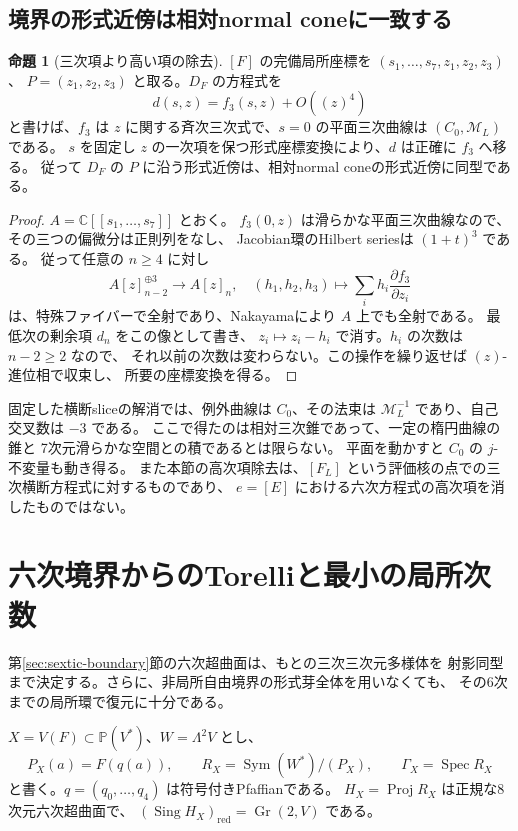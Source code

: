 \documentclass[a4paper,11pt]{ltjsarticle}
\theoremstyle{definition}
\newtheorem{theorem}{命題}[section]
\newcommand{\CC}{\mathbb C}
\newcommand{\PP}{\mathbb P}
\newcommand{\Gr}{\operatorname{Gr}}
\begin{document}
\subsection{境界の形式近傍は相対normal coneに一致する}

\begin{theorem}[三次項より高い項の除去]\label{thm:relative-cubic-formality}
$[F]$ の完備局所座標を $(s_1,\ldots,s_7,z_1,z_2,z_3)$、
$P=(z_1,z_2,z_3)$ と取る。$D_F$ の方程式を
\[
 d(s,z)=f_3(s,z)+O((z)^4)
\]
と書けば、$f_3$ は $z$ に関する斉次三次式で、$s=0$ の平面三次曲線は
$(C_0,\mathcal M_L)$ である。
$s$ を固定し $z$ の一次項を保つ形式座標変換により、$d$ は正確に $f_3$ へ移る。
従って $D_F$ の $P$ に沿う形式近傍は、相対normal coneの形式近傍に同型である。
\end{theorem}

\begin{proof}
$A=\CC[[s_1,\ldots,s_7]]$ とおく。
$f_3(0,z)$ は滑らかな平面三次曲線なので、その三つの偏微分は正則列をなし、
Jacobian環のHilbert seriesは $(1+t)^3$ である。
従って任意の $n\ge4$ に対し
\[
 A[z]_{n-2}^{\oplus3}\longrightarrow A[z]_n,
 \quad(h_1,h_2,h_3)\longmapsto
 \sum_i h_i\frac{\partial f_3}{\partial z_i}
\]
は、特殊ファイバーで全射であり、Nakayamaにより $A$ 上でも全射である。
最低次の剰余項 $d_n$ をこの像として書き、
$z_i\mapsto z_i-h_i$ で消す。$h_i$ の次数は $n-2\ge2$ なので、
それ以前の次数は変わらない。この操作を繰り返せば $(z)$-進位相で収束し、
所要の座標変換を得る。
\end{proof}

固定した横断sliceの解消では、例外曲線は $C_0$、その法束は
$\mathcal M_L^{-1}$ であり、自己交叉数は $-3$ である。
ここで得たのは相対三次錐であって、一定の楕円曲線の錐と
7次元滑らかな空間との積であるとは限らない。
平面を動かすと $C_0$ の $j$-不変量も動き得る。
また本節の高次項除去は、$[F_L]$ という評価核の点での三次横断方程式に対するものであり、
$e=[E]$ における六次方程式の高次項を消したものではない。

\section{六次境界からのTorelliと最小の局所次数}\label{sec:boundary-torelli}

第\ref{sec:sextic-boundary}節の六次超曲面は、もとの三次三次元多様体を
射影同型まで決定する。さらに、非局所自由境界の形式芽全体を用いなくても、
その6次までの局所環で復元に十分である。

$X=V(F)\subset\PP(V^*)$、$W=\Lambda^2V$ とし、
\[
 P_X(a)=F(q(a)),\qquad
 R_X=\operatorname{Sym}(W^*)/(P_X),\qquad
 \Gamma_X=\operatorname{Spec}R_X
\]
と書く。$q=(q_0,\ldots,q_4)$ は符号付きPfaffianである。
$H_X=\operatorname{Proj}R_X$ は正規な8次元六次超曲面で、
$(\operatorname{Sing}H_X)_{\mathrm{red}}=\Gr(2,V)$ である。
\end{document}
